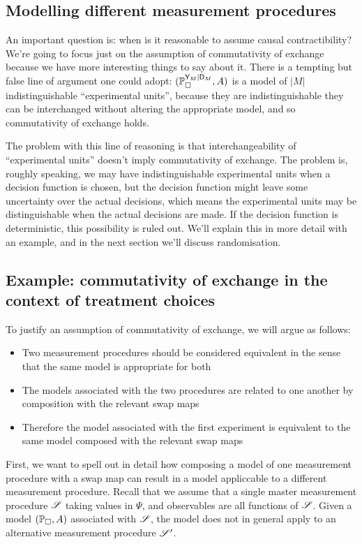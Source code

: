 \subsection{Modelling different measurement procedures}

An important question is: when is it reasonable to assume causal contractibility? We're going to focus just on the assumption of commutativity of exchange because we have more interesting things to say about it. There is a tempting but false line of argument one could adopt: $(\mathbb{P}_\square^{\mathsf{Y}_M|\mathsf{D}_M},A)$ is a model of $|M|$ indistinguishable ``experimental units'', because they are indistinguishable they can be interchanged without altering the appropriate model, and so commutativity of exchange holds.

The problem with this line of reasoning is that interchangeability of ``experimental units'' doesn't imply commutativity of exchange. The problem is, roughly speaking, we may have indistinguishable experimental units when a decision function is chosen, but the decision function might leave some uncertainty over the actual decisions, which means the experimental units may be distinguishable when the actual decisions are made. If the decision function is deterministic, this possibility is ruled out. We'll explain this in more detail with an example, and in the next section we'll discuss randomisation.

\subsection{Example: commutativity of exchange in the context of treatment choices}

To justify an assumption of commutativity of exchange, we will argue as follows:
\begin{itemize}
    \item Two measurement procedures should be considered equivalent in the sense that the same model is appropriate for both
    \item The models associated with the two procedures are related to one another by composition with the relevant swap maps
    \item Therefore the model associated with the first experiment is equivalent to the same model composed with the relevant swap maps
\end{itemize}

First, we want to spell out in detail how composing a model of one measurement procedure with a swap map can result in a model appliccable to a different measurement procedure. Recall that we assume that a single master measurement procedure $\mathscr{S}$ taking values in $\Psi$, and observables are all functions of $\mathscr{S}$. Given a model $(\mathbb{P}_\square,A)$ associated with $\mathscr{S}$, the model does not in general apply to an alternative measurement procedure $\mathscr{S}'$.

